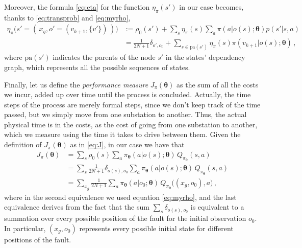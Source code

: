 Moreover, the formula \eqref{eq:eta} for the function $\eta_\pi(s')$ in our case becomes, thanks to \eqref{eq:transprob} and \eqref{eq:myrho},
\begin{equation}
    \begin{aligned}
        \eta_\pi\Big(s' = (\, x_g, o'=(v_{k+1}, \{v'\}) \,) \Big)
        &:= \rho_0(s') + \sum_s \eta_\pi(s) \sum_a \pi(a | o(s); \boldsymbol \theta) p(s' | s, a) \\
        &= \frac1{2N+1} \delta_{o', o_0} + \sum_{s \in \mathrm{pa}(s')} \eta_\pi(s) \pi(v_{k+1} | o(s); \boldsymbol \theta) \, ,
    \end{aligned}
    \label{eq:myeta}
\end{equation}
where $\mathrm{pa}(s')$ indicates the parents of the node $s'$ in the states' dependency graph, which represents all the possible sequences of states.

Finally, let us define the \emph{performance measure} $J_\pi(\boldsymbol \theta)$ as the sum of all the costs we incur, added up over time until the process is concluded. Actually, the time steps of the process are merely formal steps, since we don't keep track of the time passed, but we simply move from one substation to another. Thus, the actual physical time is in the costs, as the cost of going from one substation to another, which we measure using the time it takes to drive between them. Given the definition of $J_\pi(\boldsymbol \theta)$ as in \eqref{eq:J}, in our case we have that
\begin{equation}
    \begin{aligned}
        J_\pi(\boldsymbol \theta) 
        &= \sum_s \rho_0(s) \sum_a \pi_{\boldsymbol \theta} (a|o(s); \boldsymbol \theta) \, Q_{\pi_{\boldsymbol \theta}}(s,a) \\
        &= \sum_{s} \frac{1}{2N+1} \delta_{o(s), o_0} \sum_a \pi_{\boldsymbol \theta} (a|o(s); \boldsymbol \theta) \, Q_{\pi_{\boldsymbol \theta}}(s,a) \\
        &=  \sum_{x_g} \frac{1}{2N+1} \sum_a \pi_{\boldsymbol \theta} (a|o_0; \boldsymbol \theta) \, Q_{\pi_{\boldsymbol \theta}} \big( (x_g, o_0),a \big) \, ,
    \end{aligned}
    \label{eq:myJ}
\end{equation}
where in the second equivalence we used equation \eqref{eq:myrho}, and the last equivalence derives from the fact that the sum $\sum_s \delta_{o(s), o_0}$ is equivalent to a summation over every possible position of the fault for the initial observation $o_0$. In particular, $(x_g, o_0)$ represents every possible initial state for different positions of the fault.


